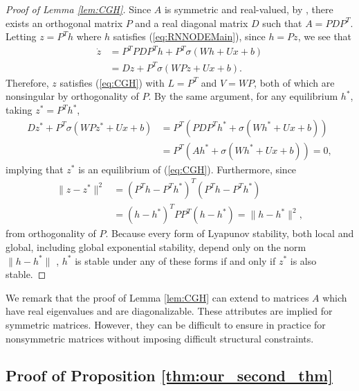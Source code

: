 \documentclass{article} \usepackage{iclr2021_conference,times}
\begin{document}
\begin{proof}[Proof of Lemma \ref{lem:CGH}]
Since $A$ is symmetric and real-valued, by \cite[Theorem 4.1.5]{horn2012matrix}, there exists an orthogonal matrix $P$ and a real diagonal matrix $D$ such that $A = PDP^T$. Letting $z = P^T h$ where $h$ satisfies (\ref{eq:RNNODEMain}), since $h = P z$, we see that
\begin{align*}
\dot{z} &= P^T P D P^T h + P^T \sigma(W h + U x + b) \\
&= D z + P^T \sigma(W P z + U x + b).
\end{align*}
Therefore, $z$ satisfies (\ref{eq:CGH}) with $L = P^T$ and $V = W P$, both of which are nonsingular by orthogonality of $P$. By the same argument, for any equilibrium $h^\ast$, taking $z^\ast = P^T h^\ast$,
\begin{align*}
D z^\ast + P^T \sigma(W P z^\ast + U x + b)
&= P^T ( P D P^T h^\ast + \sigma(W h^\ast + U x + b) ) \\
&= P^T ( A h^\ast + \sigma(W h^\ast + U x + b) ) = 0,
\end{align*}
implying that $z^\ast$ is an equilibrium of (\ref{eq:CGH}). Furthermore, since
\begin{align*}
\|z - z^\ast\|^2 &= (P^T h - P^T h^\ast)^T (P^T h - P^T h^\ast) \\
&= (h - h^\ast)^T P P^T (h - h^\ast) = \|h - h^\ast\|^2,
\end{align*}
from orthogonality of $P$. Because every form of Lyapunov stability, both local and global, including global exponential stability, depend only on the norm $\|h - h^\ast\|$ \cite[Definitions 4.4 and 4.5]{khalil2002nonlinear}, $h^\ast$ is stable under any of these forms if and only if $z^\ast$ is also stable.
\end{proof}

We remark that the proof of Lemma \ref{lem:CGH} can extend to matrices $A$ which have real eigenvalues and are diagonalizable. These attributes are implied for symmetric matrices. However, they can be difficult to ensure in practice for nonsymmetric matrices without imposing difficult structural constraints.

\subsection{Proof of Proposition \ref{thm:our_second_thm}}
\label{sxn:proof_of_second_thm}
\end{document}
